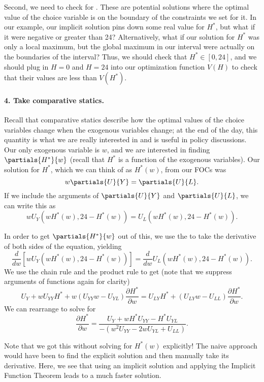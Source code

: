 Second, we need to check for . These are potential solutions where the optimal value of the choice variable is on the boundary of the constraints we set for it. In our example, our implicit solution pins down some real value for $H^*$, but what if it were negative or greater than 24? Alternatively, what if our solution for $H^*$ was only a local maximum, but the global maximum in our interval were actually on the boundaries of the interval? Thus, we should check that $H^* \in [0, 24]$, and we should plug in $H = 0$ and $H = 24$ into our optimization function $V(H)$ to check that their values are less than $V(H^*)$. 

\paragraph{4. Take comparative statics.}

Recall that comparative statics describe how the optimal values of the choice variables change when the exogenous variables change; at the end of the day, this quantity is what we are really interested in and is useful in policy discussions. Our only exogenous variable is $w$, and we are interested in finding $\partials{H^*}{w}$ (recall that $H^*$ is a function of the exogenous variables). Our solution for $H^*$, which we can think of as $H^*(w)$, from our FOCs was 
$$w\partials{U}{Y} = \partials{U}{L}.$$
If we include the arguments of $\partials{U}{Y}$ and $\partials{U}{L}$, we can write this as
$$w U_{Y}\left(w H^{*}(w), 24-H^{*}(w)\right)=U_{L}\left(w H^{*}(w), 24-H^{*}(w)\right).$$

In order to get $\partials{H^*}{w}$ out of this, we use the  to take the derivative of both sides of the equation, yielding 
$$\frac{d}{d w}\left[w U_{Y}\left(w H^{*}(w), 24-H^{*}(w)\right)\right]=\frac{d}{d w} U_{L}\left(w H^{*}(w), 24-H^{*}(w)\right).$$
We use the chain rule and the product rule to get (note that we suppress arguments of functions again for clarity)
$$U_{Y}+w U_{Y Y} H^{*}+w\left(U_{Y Y} w-U_{Y L}\right) \frac{\partial H^{*}}{\partial w} = U_{L Y} H^{*}+\left(U_{L Y} w-U_{L L}\right) \frac{\partial H^{*}}{\partial w}.$$
We can rearrange to solve for 
$$\boxed{\frac{\partial H^{*}}{\partial w}=\frac{U_{Y}+w H^{*} U_{Y Y}-H^{*} U_{Y L}}{-\left(w^{2} U_{Y Y}-2 w U_{Y L}+U_{L L}\right)}.}$$

Note that we got this without solving for $H^*(w)$ explicitly! The naive approach would have been to find the explicit solution and then manually take its derivative. Here, we see that using an implicit solution and applying the Implicit Function Theorem leads to a much faster solution.

